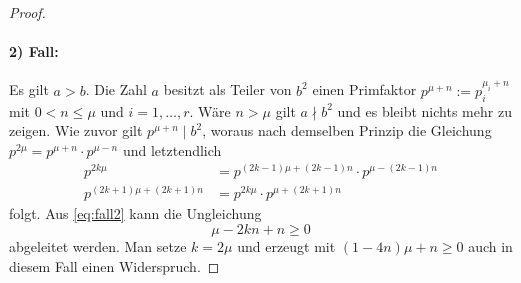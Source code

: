 \begin{proof}
\paragraph{2) Fall:}
Es gilt $a > b$. Die Zahl $a$ besitzt als Teiler von $b^2$ einen Primfaktor
$p^{\mu + n} := p_i^{\mu_i + n}$ mit $0 < n \leq \mu$ und $i = 1,\dotsc,r$.
Wäre $n > \mu$ gilt $a \nmid b^2$ und es bleibt nichts mehr zu zeigen.
Wie zuvor gilt $p^{\mu + n} \mid b^2$,
woraus nach demselben Prinzip die Gleichung
$p^{2\mu} = p^{\mu + n} \cdot p^{\mu - n}$
und letztendlich
\begin{align*}
\label{eq:fall2} \tag{$**$}
p^{2k\mu} & = p^{(2k - 1)\mu + (2k - 1)n} \cdot p^{\mu - (2k - 1)n} \\
p^{(2k + 1)\mu + (2k + 1)n} & = p^{2k\mu} \cdot p^{\mu + (2k + 1)n}
\end{align*}
folgt. Aus \eqref{eq:fall2} kann die Ungleichung
\begin{equation*}
\mu - 2kn + n \geq 0
\end{equation*}
abgeleitet werden. Man setze $k = 2\mu$ und erzeugt mit
$(1 - 4n)\mu + n \geq 0$ auch in diesem Fall einen Widerspruch.
\end{proof}